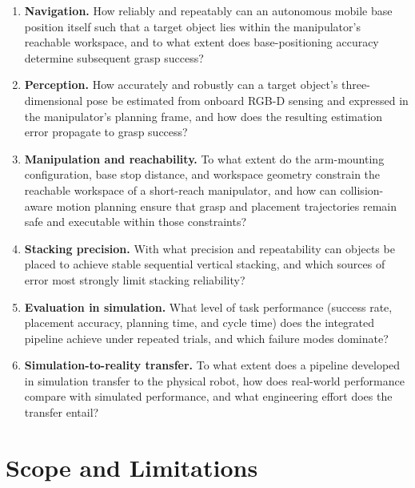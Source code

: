 \documentclass[11pt,a4paper]{article}
\begin{document}
\begin{enumerate}[label=\textbf{\arabic*.}, leftmargin=1.5em, itemsep=0.4em]

    \item \textbf{Navigation.}
    How reliably and repeatably can an autonomous mobile base position itself such that a
    target object lies within the manipulator's reachable workspace, and to what extent
    does base-positioning accuracy determine subsequent grasp success?

    \item \textbf{Perception.}
    How accurately and robustly can a target object's three-dimensional pose be estimated
    from onboard RGB-D sensing and expressed in the manipulator's planning frame, and how
    does the resulting estimation error propagate to grasp success?

    \item \textbf{Manipulation and reachability.}
    To what extent do the arm-mounting configuration, base stop distance, and workspace
    geometry constrain the reachable workspace of a short-reach manipulator, and how can
    collision-aware motion planning ensure that grasp and placement trajectories remain
    safe and executable within those constraints?

    \item \textbf{Stacking precision.}
    With what precision and repeatability can objects be placed to achieve stable
    sequential vertical stacking, and which sources of error most strongly limit stacking
    reliability?

    \item \textbf{Evaluation in simulation.}
    What level of task performance (success rate, placement accuracy, planning time, and
    cycle time) does the integrated pipeline achieve under repeated trials, and which
    failure modes dominate?

    \item \textbf{Simulation-to-reality transfer.}
    To what extent does a pipeline developed in simulation transfer to the physical robot,
    how does real-world performance compare with simulated performance, and what
    engineering effort does the transfer entail?

\end{enumerate}

\newpage

\section{Scope and Limitations}
\end{document}
